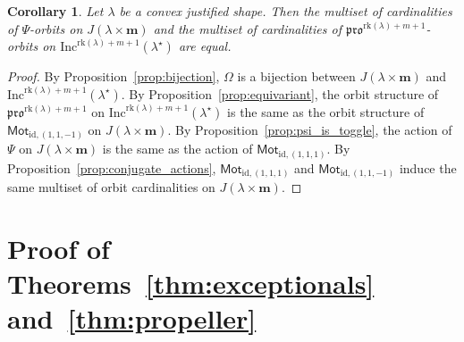 \documentclass[12pt]{amsart}
\newtheorem{corollary}[theorem]{Corollary}
\theoremstyle{definition}
\theoremstyle{remark}
\numberwithin{equation}{section}
\newcommand{\inc}{\ensuremath{\mathrm{Inc}}}
\newcommand{\incgl}{\inc_{\mathrm{gl}}}
\newcommand{\pro}{\mathfrak{pro}}
\newcommand{\rank}{\ensuremath{\mathrm{rk}}}
\newcommand{\mot}{\ensuremath{\mathsf{Mot}}}
\newcommand{\deflate}{\ensuremath{\mathsf{Defl}}}
\newcommand{\content}{\ensuremath{\mathsf{Con}}}
\begin{document}
\begin{corollary}\label{cor:multisets}
Let $\lambda$ be a convex justified shape.
Then the multiset of cardinalities of $\Psi$-orbits on $J(\lambda \times \mathbf{m})$ and the multiset of cardinalities of $\pro^{\rank(\lambda)+ m+1}$-orbits on $\inc^{\rank(\lambda)+ m+1}(\lambda^\star)$ are equal.
\end{corollary}
\begin{proof}
By Proposition~\ref{prop:bijection}, $\Omega$ is a bijection between $J(\lambda \times \mathbf{m})$ and $\inc^{\rank(\lambda)+ m+1}(\lambda^\star)$. By Proposition~\ref{prop:equivariant}, the orbit structure of $\pro^{\rank(\lambda)+ m+1}$ on $\inc^{\rank(\lambda)+ m+1}(\lambda^\star)$ is the same as the orbit structure of $\mot_{\mathrm{id},(1,1,-1)}$ on $J(\lambda \times \mathbf{m})$. By Proposition~\ref{prop:psi_is_toggle}, the action of $\Psi$ on $J(\lambda \times \mathbf{m})$ is the same as the action of $\mot_{\mathrm{id},(1,1,1)}$. By Proposition~\ref{prop:conjugate_actions}, $\mot_{\mathrm{id},(1,1,1)}$ and $\mot_{\mathrm{id},(1,1,-1)}$ induce the same multiset of orbit cardinalities on $J(\lambda \times \mathbf{m})$.
\end{proof}

\section{Proof of Theorems~\ref{thm:exceptionals} and~\ref{thm:propeller}}\label{sec:arithmetic}
%
\end{document}

